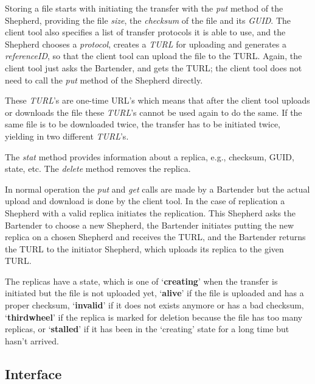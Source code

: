 \documentclass{book}
\begin{document}
Storing a file starts with initiating the transfer with the \emph{put} method of the Shepherd, providing the file \emph{size}, the \emph{checksum} of the file and its \emph{GUID}. The client tool also specifies a list of transfer protocols it is able to use, and the Shepherd chooses a \emph{protocol}, creates a \emph{TURL} for uploading and generates a \emph{referenceID}, so that the client tool can upload the file to the TURL. Again, the client tool just asks the Bartender, and gets the TURL; the client tool does not need to call the \emph{put} method of the Shepherd directly.

These \emph{TURL}'s are one-time URL's which means that after the client tool uploads or downloads the file these \emph{TURL}'s cannot be used again to do the same. If the same file is to be downloaded twice, the transfer has to be initiated twice, yielding in two different \emph{TURL}'s.

The \emph{stat} method provides information about a replica, e.g., checksum, GUID, state, etc. The \emph{delete} method removes the replica.

In normal operation the \emph{put} and \emph{get} calls are made by a Bartender but the actual upload and download is done by the client tool. In the case of replication a Shepherd with a valid replica initiates the replication. This Shepherd asks the Bartender to choose a new Shepherd, the Bartender initiates putting the new replica on a chosen Shepherd and receives the TURL, and the Bartender returns the TURL to the initiator Shepherd, which uploads its replica to the given TURL.

The replicas have a state, which is one of `\textbf{creating}' when the transfer is initiated but the file is not uploaded yet, `\textbf{alive}' if the file is uploaded and has a proper checksum, `\textbf{invalid}' if it does not exists anymore or has a bad checksum, `\textbf{thirdwheel}' if the replica is marked for deletion because the file has too many replicas, or `\textbf{stalled}' if it has been in the `creating' state for a long time but hasn't arrived.


\subsection{Interface} %
\end{document}
